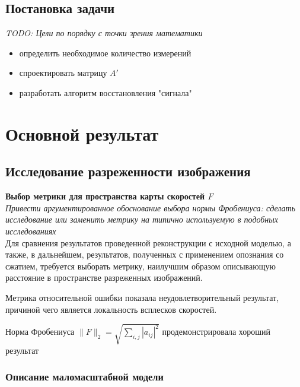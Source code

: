 \documentclass[14pt]{matmex-diploma}
\begin{document}
\subsection{Постановка задачи}
\textit{TODO: Цели по порядку с точки зрения математики} \\
\begin{itemize}
\item определить необходимое количество измерений
\item спроектировать матрицу $A'$
\item разработать алгоритм восстановления "сигнала"
\end{itemize}



\section{Основной результат}


\subsection{Исследование разреженности изображения}

\textbf{Выбор метрики для пространства карты скоростей $F$} \\
\textit{Привести аргументированное обоснование выбора нормы Фробениуса: сделать исследование или заменить метрику на типично используемую в подобных исследованиях} \\

Для сравнения результатов проведенной реконструкции с исходной моделью, а также, в дальнейшем, результатов, полученных с применением опознания со сжатием, требуется выборать метрику, наилучшим образом описывающую расстояние в пространстве разреженных изображений. 
\begin{description}
\item Метрика относительной ошибки показала неудовлетворительный результат, причиной чего является локальность всплесков скоростей. 
\item Норма Фробениуса $\| F \|_2 = \sqrt{\displaystyle\sum_{i,j}{| a_{ij} |^2}}$ продемонстрировала хороший результат
\end{description}


\subsubsection{Описание маломасштабной модели} \label{sec:model_desc}
\end{document}
